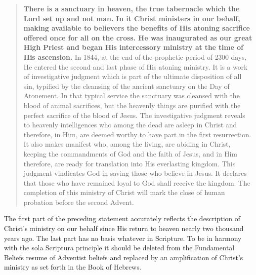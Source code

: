 \begin{quote}
\textbf{There is a sanctuary in heaven, the true tabernacle which
the Lord set up and not man. In it Christ ministers in our behalf,
making
available to believers the benefits of His atoning sacrifice offered once
for all on the cross. He was inaugurated as our great High Priest and
began
His intercessory ministry at the time of His ascension.} In 1844, at the
end
of the prophetic period of 2300 days, He entered the second and last phase
of His atoning ministry. It is a work of investigative judgment which is
part of the ultimate disposition of all sin, typified by the cleansing of
the ancient sanctuary on the Day of Atonement. In that typical service the
sanctuary was cleansed with the blood of animal sacrifices, but the heavenly
things are purified with the perfect sacrifice of the blood of Jesus. The
investigative judgment reveals to heavenly intelligences who among the dead
are asleep in Christ and therefore, in Him, are deemed worthy to have part
in the first resurrection. It also makes manifest who, among the living, are
abiding in Christ, keeping the commandments of God and the faith of Jesus,
and in Him therefore, are ready for translation into His everlasting
kingdom. This judgment vindicates God in saving those who believe in Jesus.
It declares that those who have remained loyal to God shall receive the 
kingdom. The completion of this ministry of Christ will mark the close of
human probation before the second Advent.
\end{quote}

The first part of the preceding statement accurately reflects the
description of Christ's ministry on our behalf since His return to heaven
nearly two thousand years ago. The last part has no basis whatever in
Scripture. To be in harmony with the sola Scriptura principle it should be
deleted from the Fundamental Beliefs resume of Adventist beliefs and
replaced by an amplification of Christ's ministry as set forth in the Book
of Hebrews.

